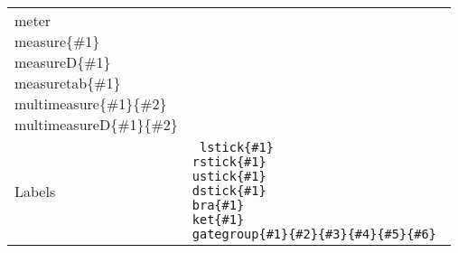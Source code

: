 \documentclass[twocolumn,nofootinbib]{revtex4}
\begin{document}
{\begin{center}
\begin{tabular}{l | l }
{                    \char92 meter \\
                    \char92 measure\{\#1\} \\
                    \char92 measureD\{\#1\} \\
                    \char92 measuretab\{\#1\} \\
                    \char92 multimeasure\{\#1\}\{\#2\} \\
                    \char92 multimeasureD\{\#1\}\{\#2\} } \\
        Labels & \parbox[t]{6cm}{\tt
                     lstick\{\#1\} \\
                     rstick\{\#1\} \\
                     ustick\{\#1\} \\
                     dstick\{\#1\} \\
                     bra\{\#1\} \\
                     ket\{\#1\} \\
                     gategroup\{\#1\}\{\#2\}\{\#3\}\{\#4\}\{\#5\}\{\#6\} }
    \end{tabular}
\end{center}}
\end{document}
